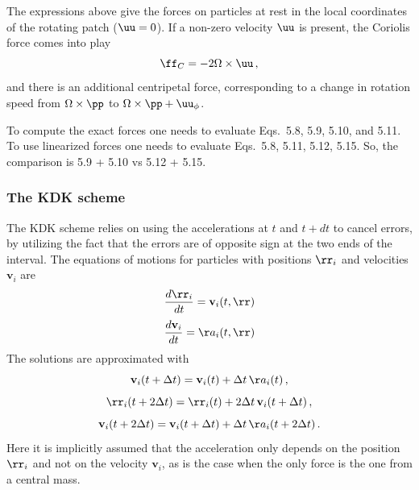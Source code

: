 \documentclass[paper=a4,fontsize=11pt]{scrartcl}
\numberwithin{equation}{section}		%
\numberwithin{figure}{section}			%
\numberwithin{table}{section}				%
\begin{document}
\def\vv{\mathbf{v}}
The expressions above give the forces on particles at rest in the local coordinates of the rotating patch ($\uu=0$).  If a non-zero velocity $\uu$ is present, the Coriolis force comes into play
\begin{equation}
    \ff_C = -2 \Omega \times \uu \,,
\end{equation}
and there is an additional centripetal force, corresponding to a change in rotation speed from $\Omega \times \pp$ to $\Omega \times \pp + \uu_{\phi}$.

To compute the exact forces one needs to evaluate Eqs.\ 5.8, 5.9, 5.10, and 5.11.  To use linearized forces one needs to evaluate Eqs.\ 5.8, 5.11, 5.12, 5.15.  So, the comparison is 5.9 + 5.10 vs 5.12 + 5.15.

\subsubsection{The KDK scheme}

The KDK scheme relies on using the accelerations at $t$ and $t+dt$ to cancel errors, by utilizing the fact that the errors are of opposite sign at the two ends of the interval.
The equations of motions for particles with positions $\rr_i$ and velocities $\vv_i$ are
\renewcommand{\DD}[2]{\frac{d #1}{d #2}}
\newcommand{\PD}[2]{\frac{\partial #1}{\partial #2}}
\begin{equation}
    \DD{\rr_i}{t} = \vv_i(t,\rr)
\end{equation}
\begin{equation}
    \DD{\vv_i}{t} = \aa_i(t,\rr)
\end{equation}
The solutions are approximated with
\begin{equation}
    \vv_i(t+\Delta t) = \vv_i(t) + \Delta t\,\aa_i(t) \,,
\end{equation}
\begin{equation}
    \rr_i(t+2 \Delta t) = \rr_i(t) + 2\Delta t\, \vv_i(t+\Delta t) \,,
\end{equation}
\begin{equation}
    \vv_i(t+2\Delta t) = \vv_i(t+\Delta t) + \Delta t\, \aa_i(t+2\Delta t) \,.
\end{equation}
Here it is implicitly assumed that the acceleration only depends on the position $\rr_i$ and not on the velocity $\vv_i$, as is the case when the only force is the one from a central mass.
\end{document}
